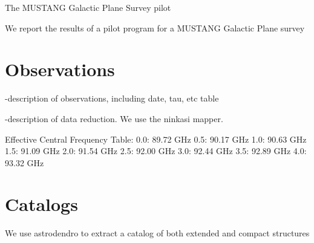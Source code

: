 The MUSTANG Galactic Plane Survey pilot

We report the results of a pilot program for a MUSTANG Galactic Plane survey

\section{Observations}

-description of observations, including date, tau, etc table

-description of data reduction.  We use the ninkasi mapper.

Effective Central Frequency Table:
0.0: 89.72 GHz
0.5: 90.17 GHz
1.0: 90.63 GHz
1.5: 91.09 GHz
2.0: 91.54 GHz
2.5: 92.00 GHz
3.0: 92.44 GHz
3.5: 92.89 GHz
4.0: 93.32 GHz

\section{Catalogs}

We use astrodendro to extract a catalog of both extended and compact structures
